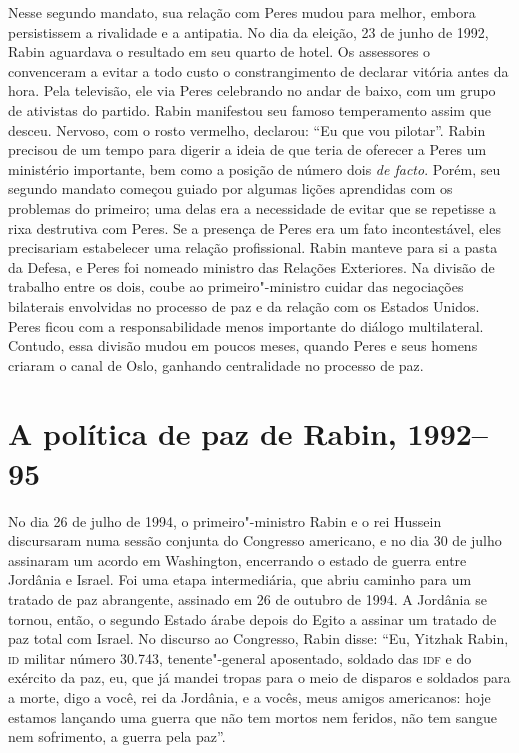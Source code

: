 Nesse segundo mandato, sua relação com Peres mudou para melhor, embora
persistissem a rivalidade e a antipatia. No dia da eleição, 23 de junho
de 1992, Rabin aguardava o resultado em seu quarto de hotel. Os
assessores o convenceram a evitar a todo custo o constrangimento de
declarar vitória antes da hora. Pela televisão, ele via Peres celebrando no
andar de baixo, com um grupo de ativistas do partido. Rabin manifestou
seu famoso temperamento assim que desceu. Nervoso, com o rosto vermelho,
declarou: ``Eu que vou pilotar''. Rabin precisou de um tempo para
digerir a ideia de que teria de oferecer a Peres um ministério
importante, bem como a posição de número dois \textit{de facto}. Porém,
seu segundo mandato começou guiado por algumas lições aprendidas com os
problemas do primeiro; uma delas era a necessidade de evitar que se
repetisse a rixa destrutiva com Peres. Se a presença de Peres era um
fato incontestável, eles precisariam estabelecer uma relação
profissional. Rabin manteve para si a pasta da Defesa, e Peres foi
nomeado ministro das Relações Exteriores. Na divisão de trabalho entre
os dois, coube ao primeiro"-ministro cuidar das negociações bilaterais
envolvidas no processo de paz e da relação com os Estados Unidos. Peres
ficou com a responsabilidade menos importante do diálogo multilateral.
Contudo, essa divisão mudou em poucos meses, quando Peres e seus
homens criaram o canal de Oslo, ganhando centralidade no processo de
paz.

\chapter[A política de paz de Rabin, 1992--95]{A política de paz de Rabin, 1992--95}

No dia 26 de julho de 1994, o primeiro"-ministro Rabin e o rei Hussein
discursaram numa sessão conjunta do Congresso americano, e no dia 30 de
julho assinaram um acordo em Washington, encerrando o estado de guerra
entre Jordânia e Israel. Foi uma etapa intermediária, que abriu caminho
para um tratado de paz abrangente, assinado em 26 de outubro de 1994. A
Jordânia se tornou, então, o segundo Estado árabe depois do Egito a
assinar um tratado de paz total com Israel. No discurso ao Congresso,
Rabin disse: ``Eu, Yitzhak Rabin, \textsc{id} militar número 30.743,
tenente"-general aposentado, soldado das \textsc{idf} e do exército da paz, eu,
que já mandei tropas para o meio de disparos e soldados para a morte,
digo a você, rei da Jordânia, e a vocês, meus amigos americanos: hoje
estamos lançando uma guerra que não tem mortos nem feridos, não tem
sangue nem sofrimento, a guerra pela paz''.

